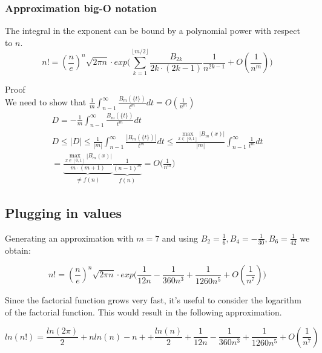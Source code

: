 \documentclass[a4paper]{article}
\begin{document}
    \subsubsection{Approximation big-O notation}

    \begin{theorem}
        The integral in the exponent can be bound by a polynomial power with respect to $n$.
        \begin{equation}
            \boxed{
                n! = (\frac{n}{e})^n \sqrt{2\pi n} \cdot
                exp \Big( \sum_{k=1}^{\lfloor m/2 \rfloor} \frac{B_{2k}}{2k \cdot (2k-1)} \frac{1}{n^{2k-1}} + O(\frac{1}{n^m}) \Big)
            }\label{eq:equation29}
        \end{equation}

        Proof
        \\
        We need to show that $\frac{1}{m} \int_{n-1}^{\infty} \frac{B_m(\{t\})}{t^m}  dt = O \left( \frac{1}{n^m} \right)$
        \begin{gather*}
            D = - \frac{1}{m} \int_{n-1}^{\infty} \frac{B_m(\{t\})}{t^m}  dt
            \\
            D \leq  |D| \leq \frac{1}{|m|} \int_{n-1}^{\infty} \frac{|B_m(\{t\})|}{t^m} dt \leq
            \frac{\max_{x \in [0,1]} |B_m(x)|}{|m|} \int_{n-1}^{\infty} \frac{1}{t^m}  dt
            \\
            =
            \underbrace{\frac{\max_{x \in [0,1]} |B_m(x)|}{m\cdot (m+1)}}_{\neq f(n)}
            \underbrace{\frac{1}{(n-1)^m}}_{f(n)}
            = O \big( \frac{1}{n^m} \big)
        \end{gather*}
    \end{theorem}

    \subsection{Plugging in values}\label{subsec:plugging-in-values}
    Generating an approximation with $m=7$ and using $B_2=\frac{1}{6}, B_4=-\frac{1}{30}, B_6=\frac{1}{42}$ we obtain:

    \begin{equation}
        \label{eq:n_factorial_approx}
        n! = (\frac{n}{e})^n \sqrt{2\pi n} \cdot
        exp \Big( \frac{1}{12 n}
        -
        \frac{1}{360 n^{3}}
        +
        \frac{1}{1260 n^{5}}
        + O(\frac{1}{n^7}) \Big)
    \end{equation}

    Since the factorial function grows very fast, it's useful to consider the logarithm of the factorial function.
    This would result in the following approximation.

    \begin{equation}
        \label{eq:log_n_factorial_approx}
        ln(n!) =
        \frac{ln(2\pi)}{2} +
        n ln(n) - n +
        + \frac{ln(n)}{2}
        + \frac{1}{12 n}
        - \frac{1}{360 n^{3}}
        + \frac{1}{1260 n^{5}}
        + O(\frac{1}{n^7})
    \end{equation}
\end{document}
